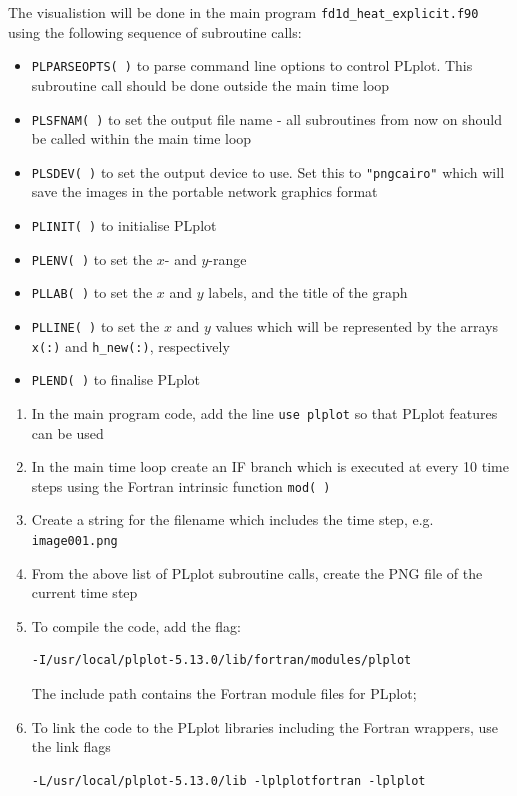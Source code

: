 \documentclass[12pt]{article}
\begin{document}
\begin{enumerate}
The visualistion will be done in the main program \texttt{fd1d\_heat\_explicit.f90} using the
following sequence of subroutine calls:
\begin{itemize}
\item\texttt{PLPARSEOPTS( )} to parse command line options to control PLplot. This subroutine
call should be done outside the main time loop
\item\texttt{PLSFNAM( )} to set the output file name - all subroutines from now on should be
called within the main time loop
\item\texttt{PLSDEV( )} to set the output device to use. Set this to \texttt{"pngcairo"} which
will save the images in the portable network graphics format
\item\texttt{PLINIT( )} to initialise PLplot
\item\texttt{PLENV( )} to set the $x$- and $y$-range
\item\texttt{PLLAB( )} to set the $x$ and $y$ labels, and the title of the graph
\item\texttt{PLLINE( )} to set the $x$ and $y$ values which will be represented by the
  arrays \texttt{x(:)} and \texttt{h\_new(:)}, respectively
\item\texttt{PLEND( )} to finalise PLplot
\end{itemize}  
\begin{enumerate}
\item In the main program code, add the line \texttt{use plplot} so that PLplot features can be
used
\item In the main time loop create an IF branch which is executed at every 10 time steps
using the Fortran intrinsic function \texttt{mod( )}
\item Create a string for the filename which includes the time step, e.g. 
\texttt{image001.png}
\item From the above list of PLplot subroutine calls, create the PNG file of the
current time step
\item To compile the code, add the flag:
\begin{verbatim}
-I/usr/local/plplot-5.13.0/lib/fortran/modules/plplot
\end{verbatim}
The include path contains the Fortran module files for PLplot;
\item To link the code to the PLplot libraries including the Fortran wrappers, use the link flags
\begin{verbatim}
-L/usr/local/plplot-5.13.0/lib -lplplotfortran -lplplot
\end{verbatim}

\end{enumerate}
\end{enumerate}
\end{document}
